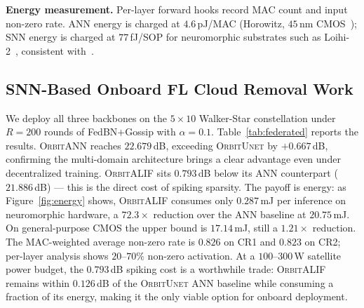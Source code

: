 \documentclass[conference]{IEEEtran}
\newcommand{\OrbitALIF}{\textsc{OrbitALIF}}
\newcommand{\OrbitANN}{\textsc{OrbitANN}}
\newcommand{\OrbitUnet}{\textsc{OrbitUnet}}
\begin{document}
\noindent\textbf{Energy measurement.}
Per-layer forward hooks record MAC count and input non-zero rate.
ANN energy is charged at $4.6$\,pJ/MAC (Horowitz, $45$\,nm
CMOS~\cite{ref:horowitz2014}); SNN energy is charged at
$77$\,fJ/SOP for neuromorphic substrates such as
Loihi-2~\cite{ref:loihi}, consistent
with~\cite{ref:flsnn,ref:esdnet}.

% 

\subsection{SNN-Based Onboard FL Cloud Removal Work}
\label{sec:exp-feasibility}

We deploy all three backbones on the $5{\times}10$ Walker-Star
constellation under $R\!=\!200$ rounds of FedBN$+$Gossip with
$\alpha\!=\!0.1$. Table~\ref{tab:federated} reports the results.
\OrbitANN{} reaches $22.679$\,dB, exceeding \OrbitUnet{} by
$+0.667$\,dB, confirming the multi-domain architecture brings a
clear advantage even under decentralized training.
\OrbitALIF{} sits $0.793$\,dB below its ANN counterpart
($21.886$\,dB) — this is the direct cost of spiking sparsity.
The payoff is energy: as Figure~\ref{fig:energy} shows,
\OrbitALIF{} consumes only $0.287$\,mJ per inference on
neuromorphic hardware, a $72.3\times$ reduction
over the ANN baseline at $20.75$\,mJ. On general-purpose CMOS
the upper bound is $17.14$\,mJ, still a $1.21\times$ reduction.
The MAC-weighted average non-zero rate is $0.826$ on CR1 and
$0.823$ on CR2; per-layer analysis shows $20$--$70\%$ non-zero
activation. At a $100$--$300$\,W satellite power budget, the
$0.793$\,dB spiking cost is a worthwhile trade: \OrbitALIF{}
remains within $0.126$\,dB of the \OrbitUnet{} ANN baseline while
consuming a fraction of its energy, making it the only viable
option for onboard deployment.
\end{document}
